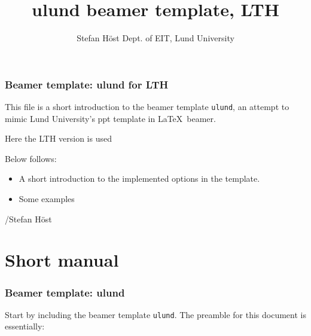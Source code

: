 \documentclass[aspectratio=1610]{beamer}
\title[ulund beamer]{ulund beamer template, LTH}
\author[S. Höst]{%
  Stefan Höst\newline
  Dept. of EIT, Lund University}
\begin{document}
\begin{frame}[plain]%
  \titlepage
\end{frame}

\begin{frame}
  \frametitle{Beamer template: ulund for LTH}
  This file is a short introduction to the beamer template \texttt{ulund}, an attempt to mimic Lund University's ppt template in \LaTeX\ beamer.

  Here the LTH version is used
  
Below follows:
\begin{itemize}
\item A short introduction to the implemented options in the template. 
\item Some examples
\end{itemize}

/Stefan Höst
\end{frame}


\section{Short manual}

\begin{frame}[fragile]
  \frametitle{Beamer template: ulund}
  Start by including the beamer template \texttt{ulund}. The preamble for this document is essentially: 
\end{frame}
\end{document}
